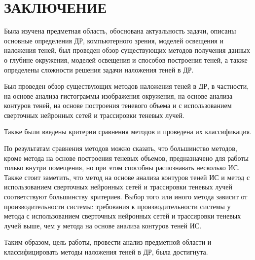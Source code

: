 \chapter*{ЗАКЛЮЧЕНИЕ}

Была изучена предметная область, обоснована актуальность задачи, описаны основные определения ДР, компьютерного зрения, моделей освещения и наложения теней, был проведен обзор существующих методов получения данных о глубине окружения, моделей освещения и способов построения теней, а также определены сложности решения задачи наложения теней в ДР.

Был проведен обзор существующих методов наложения теней в ДР, в частности, на основе анализа гистограммы изображения окружения, на основе анализа контуров теней, на основе построения теневого объема и с использованием сверточных нейронных сетей и трассировки теневых лучей.

Также были введены критерии сравнения методов и проведена их классификация.

По результатам сравнения методов можно сказать, что большинство методов, кроме метода на основе построения теневых объемов, предназначено для работы только внутри помещения, но при этом способны распознавать несколько ИС. Также стоит заметить, что метод на основе анализа контуров теней ИС и метод с использованием сверточных нейронных сетей и трассировки теневых лучей соответствуют большинству критериев. Выбор того или иного метода зависит от производительности системы: требования к производительности системы у метода с использованием сверточных нейронных сетей и трассировки теневых лучей выше, чем у метода на основе анализа контуров теней ИС.

Таким образом, цель работы, провести анализ предметной области и классифицировать методы наложения теней в ДР, была достигнута.